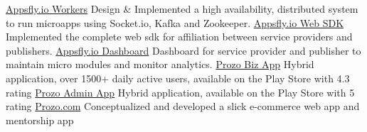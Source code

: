 \begin{cvskills}
  \cvskill
    {\href{}{Appsfly.io Workers}}
    {
      Design \& Implemented a high availability, distributed system to run microapps using Socket.io, Kafka and Zookeeper.
    }
  \cvskill
    {\href{}{Appsfly.io Web SDK}}
    {
      Implemented the complete web sdk for affiliation between service providers and publishers.
    }
    \cvskill
    {\href{https://hub.appsfly.io/}{Appsfly.io Dashboard}}
    {
      Dashboard for service provider and publisher to maintain micro modules and monitor analytics.
    }
    \cvskill
    {\href{}{Prozo Biz App}}
    {
      Hybrid application, over 1500+ daily active users, available on the Play Store with 4.3 rating
    }
    \cvskill
    {\href{https://play.google.com/store/apps/details?id=com.prozo.admin}{Prozo Admin App}}
    {
      Hybrid application, available on the Play Store with 5 rating
    }
    \cvskill
    {\href{}{Prozo.com}}
    {
      Conceptualized and developed a slick e-commerce web app and mentorship app
    }
\end{cvskills}